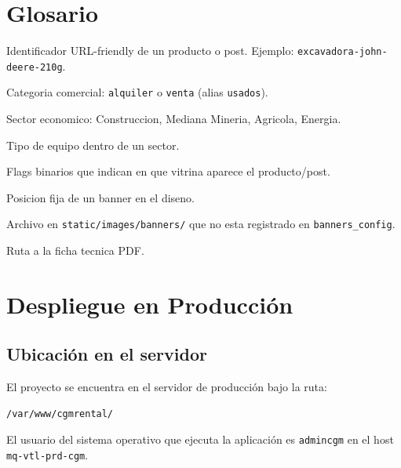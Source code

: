 \documentclass[11pt,a4paper]{article}
\begin{document}
\section{Glosario}

\begin{description}[leftmargin=*]
    \item[\texttt{slug}] Identificador URL-friendly de un producto o post.
        Ejemplo: \texttt{excavadora-john-deere-210g}.
    \item[\texttt{tag}] Categoria comercial: \texttt{alquiler} o
        \texttt{venta} (alias \texttt{usados}).
    \item[\texttt{unidad}] Sector economico: Construccion, Mediana Mineria,
        Agricola, Energia.
    \item[\texttt{tipo}] Tipo de equipo dentro de un sector.
    \item[\texttt{show\_pe / show\_arg}] Flags binarios que indican en que
        vitrina aparece el producto/post.
    \item[\texttt{slot}] Posicion fija de un banner en el diseno.
    \item[\texttt{huerfano}] Archivo en \texttt{static/images/banners/} que
        no esta registrado en \texttt{banners\_config}.
    \item[\texttt{ficha\_url}] Ruta a la ficha tecnica PDF.
\end{description}

\section{Despliegue en Producción}

\subsection{Ubicación en el servidor}

El proyecto se encuentra en el servidor de producción bajo la ruta:

\begin{lstlisting}
/var/www/cgmrental/
\end{lstlisting}

El usuario del sistema operativo que ejecuta la aplicación es
\texttt{admincgm} en el host \texttt{mq-vtl-prd-cgm}.
\end{document}

